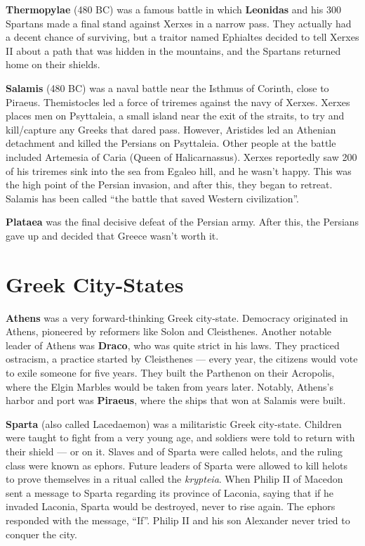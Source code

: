 \textbf{Thermopylae} (480 BC) was a famous battle in which \textbf{Leonidas} and his 300 Spartans
made a final stand against Xerxes in a narrow pass.
They actually had a decent chance of surviving,
but a traitor named Ephialtes decided to tell Xerxes II about a path that
was hidden in the mountains, and the Spartans returned home on their shields.

\textbf{Salamis} (480 BC) was a naval battle near the Isthmus of Corinth, close to Piraeus.
Themistocles led a force of triremes against the navy of Xerxes.
Xerxes places men on Psyttaleia, a small island near the exit of the straits,
to try and kill/capture any Greeks that dared pass.
However, Aristides led an Athenian detachment and killed the Persians on Psyttaleia.
Other people at the battle included Artemesia of Caria (Queen of Halicarnassus).
Xerxes reportedly saw 200 of his triremes sink into the sea from Egaleo hill, and he wasn't happy.
This was the high point of the Persian invasion, and after this, they began to retreat.
Salamis has been called ``the battle that saved Western civilization''.

\textbf{Plataea} was the final decisive defeat of the Persian army.
After this, the Persians gave up and decided that Greece wasn't worth it.

\section{Greek City-States}

\textbf{Athens} was a very forward-thinking Greek city-state.
Democracy originated in Athens, pioneered by reformers like Solon and Cleisthenes.
Another notable leader of Athens was \textbf{Draco}, who was quite strict in his laws.
They practiced ostracism, a practice started by Cleisthenes ---
every year, the citizens would vote to exile someone for five years.
They built the Parthenon on their Acropolis, where the Elgin Marbles would be taken from years later.
Notably, Athens's harbor and port was \textbf{Piraeus}, where the ships that won at Salamis were built.

\textbf{Sparta} (also called Lacedaemon) was a militaristic Greek city-state.
Children were taught to fight from a very young age, and soldiers were told to return with their shield --- or on it.
Slaves and of Sparta were called helots, and the ruling class were known as ephors.
Future leaders of Sparta were allowed to kill helots to prove themselves in a ritual called the \textit{krypteia}.
When Philip II of Macedon sent a message to Sparta regarding its province of Laconia,
saying that if he invaded Laconia, Sparta would be destroyed, never to rise again.
The ephors responded with the message, ``If''.
Philip II and his son Alexander never tried to conquer the city.

